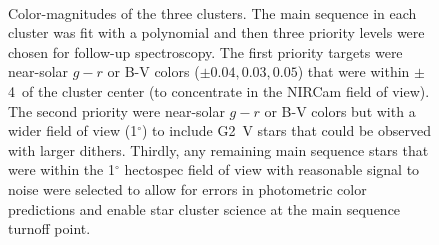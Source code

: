 \documentclass{aastex6}
\newcommand{\degree}{^\circ}
\begin{document}
\begin{figure}[!t]
\centering
{}
\\
	\caption{Color-magnitudes of the three clusters.
	The main sequence in each cluster was fit with a polynomial and then three priority levels were chosen for follow-up spectroscopy.
	The first priority targets were near-solar $g-r$ or B-V colors ($\pm 0.04, 0.03, 0.05$) that were within $\pm$4\arcmin\ of the cluster center (to concentrate in the NIRCam field of view).
	The second priority were near-solar $g-r$ or B-V colors but with a wider field of view (1$\degree$) to include G2~V stars that could be observed with larger dithers.
	Thirdly, any remaining main sequence stars that were within the 1$\degree$ hectospec field of view with reasonable signal to noise were selected to allow for errors in photometric color predictions and enable star cluster science at the main sequence turnoff point.}
	\label{fig:cmdPS}
\end{figure} 
\end{document}
